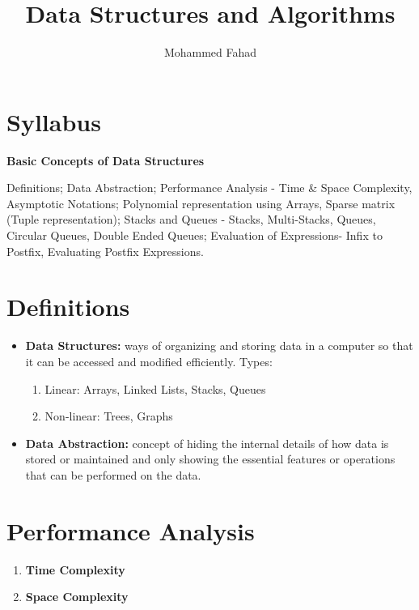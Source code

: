\documentclass{article}
\title{Data Structures and Algorithms}
\author{Mohammed Fahad}
\begin{document}
\maketitle

\section*{Syllabus}

\textbf{Basic Concepts of Data Structures}

Definitions; Data Abstraction; Performance Analysis - Time \& Space
Complexity, Asymptotic Notations; Polynomial representation using
Arrays, Sparse matrix (Tuple representation); Stacks and Queues - Stacks,
Multi-Stacks, Queues, Circular Queues, Double Ended Queues; Evaluation
of Expressions- Infix to Postfix, Evaluating Postfix Expressions.

\section{Definitions}
\begin{itemize}
    \item \textbf{Data Structures:} ways of organizing and storing data in a computer so that it can be accessed and modified efficiently. Types:
    \begin{enumerate}
        \item Linear: Arrays, Linked Lists, Stacks, Queues
        \item Non-linear: Trees, Graphs
    \end{enumerate}

    \item \textbf{Data Abstraction:} concept of hiding the internal details of how data is stored or maintained and only showing the essential features or operations that can be performed on the data.
\end{itemize}

\section{Performance Analysis}
\begin{enumerate}
    \item \textbf{Time Complexity}
    \item \textbf{Space Complexity}
\end{enumerate}
\end{document}

